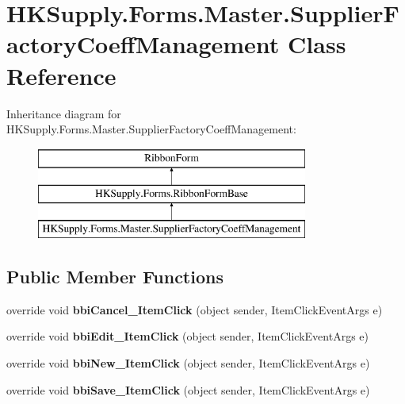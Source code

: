 \hypertarget{class_h_k_supply_1_1_forms_1_1_master_1_1_supplier_factory_coeff_management}{}\section{H\+K\+Supply.\+Forms.\+Master.\+Supplier\+Factory\+Coeff\+Management Class Reference}
\label{class_h_k_supply_1_1_forms_1_1_master_1_1_supplier_factory_coeff_management}
Inheritance diagram for H\+K\+Supply.\+Forms.\+Master.\+Supplier\+Factory\+Coeff\+Management\+:\begin{figure}[H]
\begin{center}
\leavevmode
\includegraphics[height=3.000000cm]{class_h_k_supply_1_1_forms_1_1_master_1_1_supplier_factory_coeff_management}
\end{center}
\end{figure}
\subsection*{Public Member Functions}
\begin{DoxyCompactItemize}
\item 
\mbox{\label{class_h_k_supply_1_1_forms_1_1_master_1_1_supplier_factory_coeff_management_aae2aeba19943f73cb47fb8cbd554c73b}} 
override void {\bfseries bbi\+Cancel\+\_\+\+Item\+Click} (object sender, Item\+Click\+Event\+Args e)
\item 
\mbox{\label{class_h_k_supply_1_1_forms_1_1_master_1_1_supplier_factory_coeff_management_ac572813c2fd7cc22767fe0a82fbe17ed}} 
override void {\bfseries bbi\+Edit\+\_\+\+Item\+Click} (object sender, Item\+Click\+Event\+Args e)
\item 
\mbox{\label{class_h_k_supply_1_1_forms_1_1_master_1_1_supplier_factory_coeff_management_adc52be36ad4ecec0d9a06467cf25dda1}} 
override void {\bfseries bbi\+New\+\_\+\+Item\+Click} (object sender, Item\+Click\+Event\+Args e)
\item 
\mbox{\label{class_h_k_supply_1_1_forms_1_1_master_1_1_supplier_factory_coeff_management_ae28c98b3b2a6bb3bc225ed3a75a70854}} 
override void {\bfseries bbi\+Save\+\_\+\+Item\+Click} (object sender, Item\+Click\+Event\+Args e)
\end{DoxyCompactItemize}
